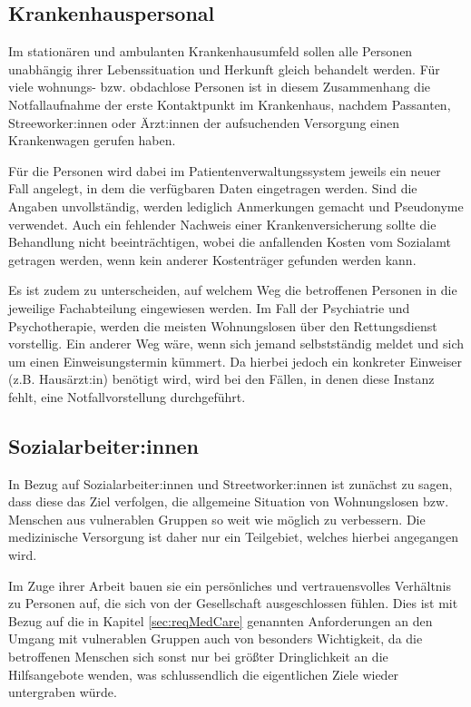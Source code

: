 \subsection{Krankenhauspersonal}

Im stationären und ambulanten Krankenhausumfeld sollen alle Personen unabhängig ihrer Lebenssituation und Herkunft gleich behandelt werden. Für viele wohnungs- bzw. obdachlose Personen ist in diesem Zusammenhang die Notfallaufnahme der erste Kontaktpunkt im Krankenhaus, nachdem Passanten, Streeworker:innen oder Ärzt:innen der aufsuchenden Versorgung einen Krankenwagen gerufen haben.

Für die Personen wird dabei im Patientenverwaltungssystem jeweils ein neuer Fall angelegt, in dem die verfügbaren Daten eingetragen werden. Sind die Angaben unvollständig, werden lediglich Anmerkungen gemacht und Pseudonyme verwendet. Auch ein fehlender Nachweis einer Krankenversicherung sollte die Behandlung nicht beeinträchtigen, wobei die anfallenden Kosten vom Sozialamt getragen werden, wenn kein anderer Kostenträger gefunden werden kann.

Es ist zudem zu unterscheiden, auf welchem Weg die betroffenen Personen in die jeweilige Fachabteilung eingewiesen werden. Im Fall der Psychiatrie und Psychotherapie, werden die meisten Wohnungslosen über den Rettungsdienst vorstellig. Ein anderer Weg wäre, wenn sich jemand selbstständig meldet und sich um einen Einweisungstermin kümmert. Da hierbei jedoch ein konkreter Einweiser (z.B. Hausärzt:in) benötigt wird, wird bei den Fällen, in denen diese Instanz fehlt, eine Notfallvorstellung durchgeführt.

\subsection{Sozialarbeiter:innen}

In Bezug auf Sozialarbeiter:innen und Streetworker:innen ist zunächst zu sagen, dass diese das Ziel verfolgen, die allgemeine Situation von Wohnungslosen bzw. Menschen aus vulnerablen Gruppen so weit wie möglich zu verbessern. Die medizinische Versorgung ist daher nur ein Teilgebiet, welches hierbei angegangen wird.

Im Zuge ihrer Arbeit bauen sie ein persönliches und vertrauensvolles Verhältnis zu Personen auf, die sich von der Gesellschaft ausgeschlossen fühlen. Dies ist mit Bezug auf die in Kapitel \ref{sec:reqMedCare} genannten Anforderungen an den Umgang mit vulnerablen Gruppen auch von besonders Wichtigkeit, da die betroffenen Menschen sich sonst nur bei größter Dringlichkeit an die Hilfsangebote wenden, was schlussendlich die eigentlichen Ziele wieder untergraben würde.

